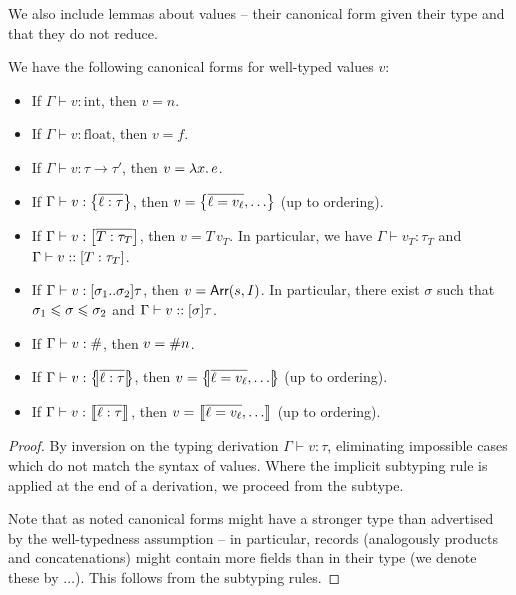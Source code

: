 We also include lemmas about values -- their canonical form given their type and that they do not reduce.
\begin{lemma}
    We have the following canonical forms for well-typed values $v$: \begin{itemize}
        \item If $\Gamma \vdash v : \mathrm{int}$, then $v = n$.
        \item If $\Gamma \vdash v : \mathrm{float}$, then $v = f$.
        \item If $\Gamma \vdash v : \tau \to \tau'$, then $v = \lambda x \ldotp e$.
        \item If $\Gamma \vdash v : \srecordtype{\overline{\ell : \tau}}$, then $v = \srecordval{\overline{\ell = v_\ell}, \dots}$ (up to ordering).
        \item If $\Gamma \vdash v : \svarianttype{\overline{T : \tau_T}}$, then $v = T\,v_T$. In particular, we have $\Gamma \vdash v_T : \tau_T$ and $\Gamma \vdash v :: \svarianttype{T : \tau_{T}}$.
        \item If $\Gamma \vdash v : \sarraytype{\sigma_1}{\sigma_2}{\tau}$, then $v = \textsf{Arr}(s,I)$. In particular, there exist $\sigma$ such that $\sigma_1 \leqslant \sigma \leqslant \sigma_2$ and $\Gamma \vdash v :: \suniarraytype{\sigma}{\tau}$.
        \item If $\Gamma \vdash v : \#$, then $v = \#{n}$.
        \item If $\Gamma \vdash v : \sproducttype{\overline{\ell : \tau}}$, then $v = \sproductval{\overline{\ell = v_\ell}, \dots}$ (up to ordering).
        \item If $\Gamma \vdash v : \sconcattype{\overline{\ell : \tau}}$, then $v = \sconcatval{\overline{\ell = v_\ell}, \dots}$ (up to ordering).
    \end{itemize}
\end{lemma}
\begin{proof}
    By inversion on the typing derivation $\Gamma \vdash v : \tau$, eliminating impossible cases which do not match the syntax of values. Where the implicit subtyping rule is applied at the end of a derivation, we proceed from the subtype. 
    
    Note that as noted canonical forms might have a stronger type than advertised by the well-typedness assumption -- in particular, records (analogously products and concatenations) might contain more fields than in their type (we denote these by $\dots$). This follows from the subtyping rules.
\end{proof}

